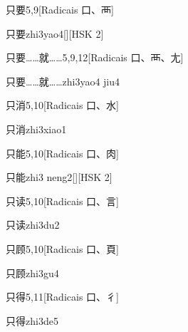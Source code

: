 \begin{entry}{只要}{5,9}[Radicais ⼝、⾑]
  \begin{phonetics}{只要}{zhi3yao4}[][HSK 2]
  \end{phonetics}
\end{entry}

\begin{entry}{只要……就……}{5,9,12}[Radicais ⼝、⾑、⼪]
  \begin{phonetics}{只要……就……}{zhi3yao4 jiu4}
  \end{phonetics}
\end{entry}

\begin{entry}{只消}{5,10}[Radicais ⼝、⽔]
  \begin{phonetics}{只消}{zhi3xiao1}
  \end{phonetics}
\end{entry}

\begin{entry}{只能}{5,10}[Radicais ⼝、⾁]
  \begin{phonetics}{只能}{zhi3 neng2}[][HSK 2]
  \end{phonetics}
\end{entry}

\begin{entry}{只读}{5,10}[Radicais ⼝、⾔]
  \begin{phonetics}{只读}{zhi3du2}
  \end{phonetics}
\end{entry}

\begin{entry}{只顾}{5,10}[Radicais ⼝、⾴]
  \begin{phonetics}{只顾}{zhi3gu4}
  \end{phonetics}
\end{entry}

\begin{entry}{只得}{5,11}[Radicais ⼝、⼻]
  \begin{phonetics}{只得}{zhi3de5}
  \end{phonetics}
\end{entry}

